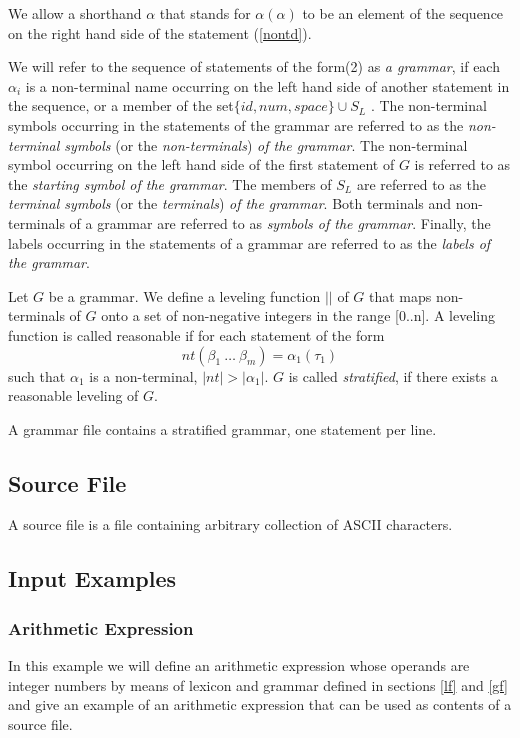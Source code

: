 \documentclass[a4paper,10pt]{article}
\begin{document}
We allow a shorthand $\alpha$ that stands for $\alpha(\alpha)$ to be an element of the sequence on the right hand side of the statement (\ref{nontd}). 


We will refer to the sequence of statements of the form(2) as \textit{a grammar}, if each $\alpha_i$ is a  non-terminal  name occurring on the left hand side of another statement in the sequence, or a member of the set$\{id, num, space\}\cup S_L$ . The non-terminal symbols occurring in the statements of the grammar are referred to as the \textit{non-terminal symbols} (or the \textit{non-terminals}) \textit{of the grammar}. 
The non-terminal symbol occurring on the left hand side of the first statement of $G$ is referred to as the \textit{starting symbol of the grammar}. The members of $S_L$ are referred to as the \textit{terminal symbols} (or the \textit{terminals}) \textit{of the grammar}.  Both terminals and non-terminals of a grammar are referred to as \textit{symbols of the grammar}. 
Finally, the labels occurring in the statements of a grammar are referred to as the \textit{labels of the grammar}.

Let $G$ be a grammar.
We define a leveling function $||$ of $G$ that maps non-terminals of $G$ onto a set of non-negative integers in the range [0..n].
A leveling function is called reasonable if for each statement of the form 
$$nt(\beta_1~\ldots~\beta_m) = \alpha_1(\tau_1)$$
such that  $\alpha_1$ is a non-terminal, $|nt|> |\alpha_1|$.
$G$ is called \textit{stratified}, if there exists a reasonable leveling of $G$.
  
A grammar file contains a stratified grammar, one  statement per line.

\subsection{Source File}\label{sf}
A source file is a file containing arbitrary collection of ASCII characters.

\subsection{Input Examples}\label{ie}
\subsubsection{Arithmetic Expression}
In this example we will define an arithmetic expression whose operands are integer numbers  by means of lexicon and grammar defined in sections \ref{lf} and \ref{gf} and give an example of an arithmetic expression that can be used as contents of a source file.
\end{document}
